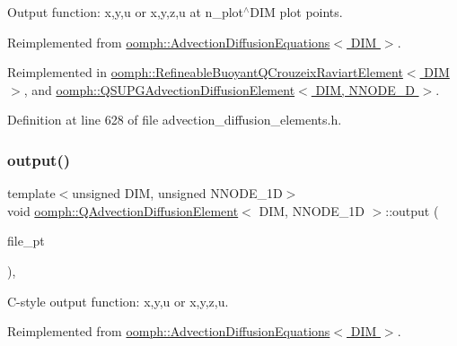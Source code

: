Output function\+: x,y,u or x,y,z,u at n\+\_\+plot$^\wedge$\+D\+IM plot points. 



Reimplemented from \hyperlink{classoomph_1_1AdvectionDiffusionEquations_ade5e445c7b99593a68fc8e42631d79be}{oomph\+::\+Advection\+Diffusion\+Equations$<$ D\+I\+M $>$}.



Reimplemented in \hyperlink{classoomph_1_1RefineableBuoyantQCrouzeixRaviartElement_a36bc6dc9052947f0932a605dd4d0e8f0}{oomph\+::\+Refineable\+Buoyant\+Q\+Crouzeix\+Raviart\+Element$<$ D\+I\+M $>$}, and \hyperlink{classoomph_1_1QSUPGAdvectionDiffusionElement_a9055a63b9b8c9f3bf606192e52413326}{oomph\+::\+Q\+S\+U\+P\+G\+Advection\+Diffusion\+Element$<$ D\+I\+M, N\+N\+O\+D\+E\+\_\+D $>$}.



Definition at line 628 of file advection\+\_\+diffusion\+\_\+elements.\+h.

\mbox{\label{classoomph_1_1QAdvectionDiffusionElement_a792f83bb2d8c22365cce60c43853396c}} 
\subsubsection{\texorpdfstring{output()}{output()}\hspace{0.1cm}{\footnotesize\ttfamily [3/4]}}
{\footnotesize\ttfamily template$<$unsigned D\+IM, unsigned N\+N\+O\+D\+E\+\_\+1D$>$ \\
void \hyperlink{classoomph_1_1QAdvectionDiffusionElement}{oomph\+::\+Q\+Advection\+Diffusion\+Element}$<$ D\+IM, N\+N\+O\+D\+E\+\_\+1D $>$\+::output (\begin{DoxyParamCaption}\item[{F\+I\+LE $\ast$}]{file\+\_\+pt }\end{DoxyParamCaption})\hspace{0.3cm}{\ttfamily [inline]}, {\ttfamily [virtual]}}



C-\/style output function\+: x,y,u or x,y,z,u. 



Reimplemented from \hyperlink{classoomph_1_1AdvectionDiffusionEquations_a063f08a2825608d32eaac5666c2ccec5}{oomph\+::\+Advection\+Diffusion\+Equations$<$ D\+I\+M $>$}.



